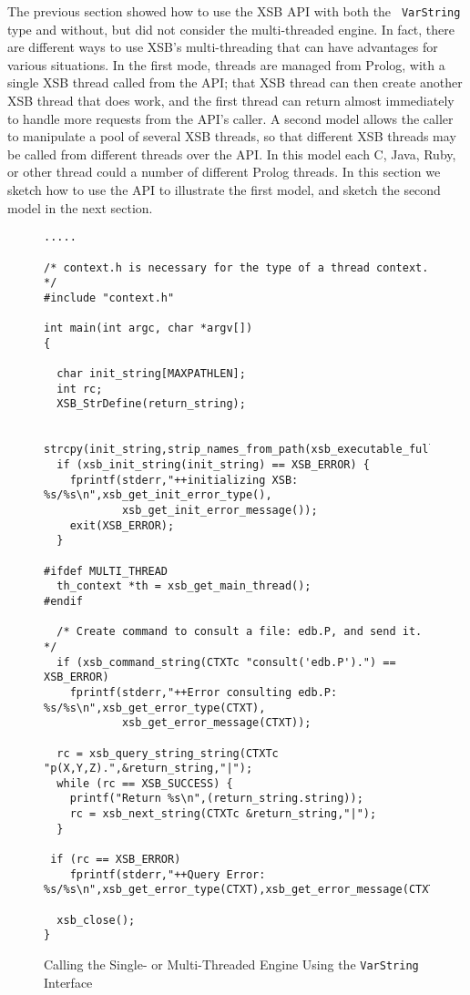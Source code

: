 The previous section showed how to use the XSB API with both the {\tt
  VarString} type and without, but did not consider the multi-threaded
engine.  In fact, there are different ways to use XSB's
multi-threading that can have advantages for various situations.  In
the first mode, threads are managed from Prolog, with a single XSB
thread called from the API; that XSB thread can then create another
XSB thread that does work, and the first thread can return almost
immediately to handle more requests from the API's caller.  A second
model allows the caller to manipulate a pool of several XSB threads,
so that different XSB threads may be called from different threads
over the API.  In this model each C, Java, Ruby, or other thread could
a number of different Prolog threads.  In this section we sketch how
to use the API to illustrate the first model, and sketch the second
model in the next section.

\begin{figure}[hbtp]
\begin{small}
\begin{verbatim}
.....

/* context.h is necessary for the type of a thread context. */
#include "context.h"

int main(int argc, char *argv[])
{ 

  char init_string[MAXPATHLEN];
  int rc;
  XSB_StrDefine(return_string);

  strcpy(init_string,strip_names_from_path(xsb_executable_full_path(argv[0]),3));
  if (xsb_init_string(init_string) == XSB_ERROR) {
    fprintf(stderr,"++initializing XSB: %s/%s\n",xsb_get_init_error_type(),
            xsb_get_init_error_message());
    exit(XSB_ERROR);
  }

#ifdef MULTI_THREAD
  th_context *th = xsb_get_main_thread();
#endif

  /* Create command to consult a file: edb.P, and send it. */
  if (xsb_command_string(CTXTc "consult('edb.P').") == XSB_ERROR)
    fprintf(stderr,"++Error consulting edb.P: %s/%s\n",xsb_get_error_type(CTXT),
            xsb_get_error_message(CTXT));

  rc = xsb_query_string_string(CTXTc "p(X,Y,Z).",&return_string,"|");
  while (rc == XSB_SUCCESS) {
    printf("Return %s\n",(return_string.string));
    rc = xsb_next_string(CTXTc &return_string,"|");
  }
 
 if (rc == XSB_ERROR) 
    fprintf(stderr,"++Query Error: %s/%s\n",xsb_get_error_type(CTXT),xsb_get_error_message(CTXT));

  xsb_close();     
}
\end{verbatim}
\end{small}
\caption{Calling the Single- or Multi-Threaded Engine Using the {\tt VarString} Interface} 
\label{fig:varstringex1}
\end{figure}

